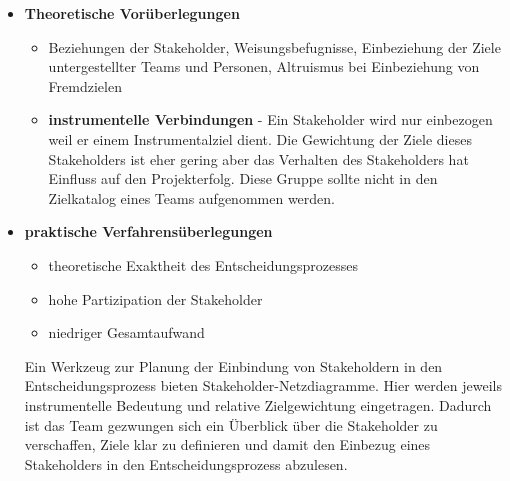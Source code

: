 \begin{itemize}
    \item \textbf{Theoretische Vorüberlegungen}
    \begin{itemize}
        \item Beziehungen der Stakeholder, Weisungsbefugnisse, Einbeziehung
            der Ziele untergestellter Teams und Personen, Altruismus bei
            Einbeziehung von Fremdzielen
        \item \textbf{instrumentelle Verbindungen} - Ein Stakeholder wird
            nur einbezogen weil er einem Instrumentalziel dient. Die Gewichtung
            der Ziele dieses Stakeholders ist eher gering aber das Verhalten
            des Stakeholders hat Einfluss auf den Projekterfolg. Diese Gruppe
            sollte nicht in den Zielkatalog eines Teams aufgenommen werden.
    \end{itemize}
    \item \textbf{praktische Verfahrensüberlegungen}
    \begin{itemize}
        \item theoretische Exaktheit des Entscheidungsprozesses
        \item hohe Partizipation der Stakeholder
        \item niedriger Gesamtaufwand
    \end{itemize}
    Ein Werkzeug zur Planung der Einbindung von Stakeholdern in den
    Entscheidungsprozess bieten Stakeholder-Netzdiagramme. Hier werden
    jeweils instrumentelle Bedeutung und relative Zielgewichtung
    eingetragen. Dadurch ist das Team gezwungen sich ein Überblick über die
    Stakeholder zu verschaffen, Ziele klar zu definieren und damit den Einbezug
    eines Stakeholders in den Entscheidungsprozess abzulesen.
\end{itemize}

